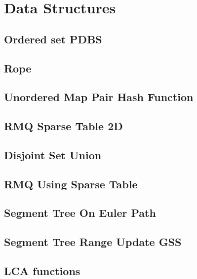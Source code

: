 \section{Data Structures}
\subsection{Ordered set PDBS}
\raggedbottom
\hrulefill
\subsection{Rope}
\raggedbottom
\hrulefill
\subsection{Unordered Map Pair Hash Function}
\raggedbottom
\hrulefill
\subsection{RMQ Sparse Table 2D}
\raggedbottom
\hrulefill
\subsection{Disjoint Set Union}
\raggedbottom
\hrulefill
\subsection{RMQ Using Sparse Table}
\raggedbottom
\hrulefill
\subsection{Segment Tree On Euler Path}
\raggedbottom
\hrulefill
\subsection{Segment Tree Range Update GSS}
\raggedbottom
\hrulefill
\subsection{LCA functions}
\raggedbottom
\hrulefill

